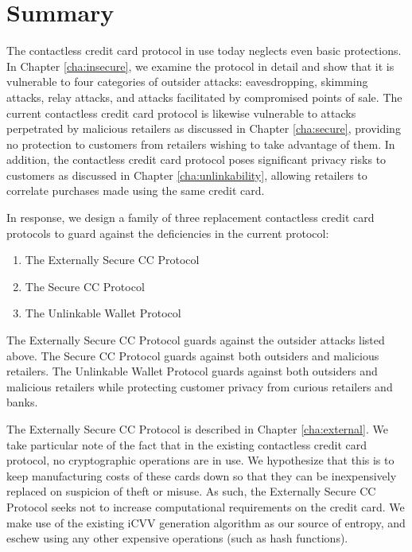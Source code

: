 \section{Summary}
\label{sec:summary}

The contactless credit card protocol in use today neglects even basic protections.
In Chapter \ref{cha:insecure}, we examine the protocol in detail and show that it is vulnerable to four categories of outsider attacks:
  eavesdropping, skimming attacks, relay attacks, and attacks facilitated by compromised points of sale.
The current contactless credit card protocol is likewise vulnerable to attacks perpetrated by malicious retailers as discussed in Chapter \ref{cha:secure},
    providing no protection to customers from retailers wishing to take advantage of them.
In addition, the contactless credit card protocol poses significant privacy risks to customers as discussed in Chapter \ref{cha:unlinkability},
    allowing retailers to correlate purchases made using the same credit card.

In response, we design a family of three replacement contactless credit card protocols to guard against the deficiencies in the current protocol:
\begin{enumerate}
    \item The Externally Secure CC Protocol
    \item The Secure CC Protocol
    \item The Unlinkable Wallet Protocol
\end{enumerate}
The Externally Secure CC Protocol guards against the outsider attacks listed above.
The Secure CC Protocol guards against both outsiders and malicious retailers.
The Unlinkable Wallet Protocol guards against both outsiders and malicious retailers while protecting customer privacy from curious retailers and banks.


The Externally Secure CC Protocol is described in Chapter \ref{cha:external}.
We take particular note of the fact that in the existing contactless credit card protocol, no cryptographic operations are in use.
We hypothesize that this is to keep manufacturing costs of these cards down so that they can be inexpensively replaced on suspicion of theft or misuse.
As such, the Externally Secure CC Protocol seeks not to increase computational requirements on the credit card.
We make use of the existing iCVV generation algorithm as our source of entropy, and eschew using any other expensive operations (such as hash functions).


